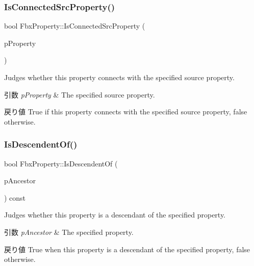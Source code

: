 \subsubsection{\texorpdfstring{Is\+Connected\+Src\+Property()}{IsConnectedSrcProperty()}}
{\footnotesize\ttfamily bool Fbx\+Property\+::\+Is\+Connected\+Src\+Property (\begin{DoxyParamCaption}\item[{const \hyperlink{class_fbx_property}{Fbx\+Property} \&}]{p\+Property }\end{DoxyParamCaption})}

Judges whether this property connects with the specified source property. 
\begin{DoxyParams}{引数}
{\em p\+Property} & The specified source property. \\
\hline
\end{DoxyParams}
\begin{DoxyReturn}{戻り値}
{\ttfamily True} if this property connects with the specified source property, {\ttfamily false} otherwise. 
\end{DoxyReturn}
\mbox{\label{class_fbx_property_aa346bfac7ee0847e7fa2a6dc4aba90ac}} 
\subsubsection{\texorpdfstring{Is\+Descendent\+Of()}{IsDescendentOf()}}
{\footnotesize\ttfamily bool Fbx\+Property\+::\+Is\+Descendent\+Of (\begin{DoxyParamCaption}\item[{const \hyperlink{class_fbx_property}{Fbx\+Property} \&}]{p\+Ancestor }\end{DoxyParamCaption}) const\hspace{0.3cm}{\ttfamily [inline]}}

Judges whether this property is a descendant of the specified property. 
\begin{DoxyParams}{引数}
{\em p\+Ancestor} & The specified property. \\
\hline
\end{DoxyParams}
\begin{DoxyReturn}{戻り値}
{\ttfamily True} when this property is a descendant of the specified property, {\ttfamily false} otherwise. 
\end{DoxyReturn}


